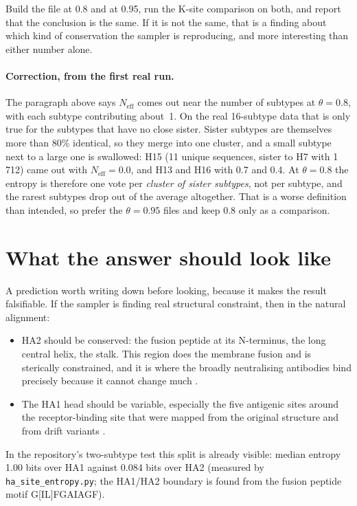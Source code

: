 \documentclass[11pt,a4paper]{article}
\newcommand{\file}[1]{\texttt{#1}}
\newcommand{\Neff}{N_{\mathrm{eff}}}
\begin{document}
\noindent
Build the file at 0.8 and at 0.95, run the K-site comparison on both, and report
that the conclusion is the same. If it is not the same, that is a finding about
which kind of conservation the sampler is reproducing, and more interesting than
either number alone.

\paragraph{Correction, from the first real run.}
The paragraph above says $\Neff$ comes out near the number of subtypes at
$\theta = 0.8$, with each subtype contributing about~1. On the real 16-subtype
data that is only true for the subtypes that have no close sister. Sister
subtypes are themselves more than 80\% identical, so they merge into one
cluster, and a small subtype next to a large one is swallowed: H15 (11 unique
sequences, sister to H7 with 1\,712) came out with $\Neff = 0.0$, and H13 and
H16 with 0.7 and 0.4. At $\theta = 0.8$ the entropy is therefore one vote per
\emph{cluster of sister subtypes}, not per subtype, and the rarest subtypes drop
out of the average altogether. That is a worse definition than intended, so
prefer the $\theta = 0.95$ files and keep 0.8 only as a comparison.

\section{What the answer should look like}

A prediction worth writing down before looking, because it makes the result
falsifiable. If the sampler is finding real structural constraint, then in the
natural alignment:

\begin{itemize}
  \item HA2 should be conserved: the fusion peptide at its N-terminus, the long
    central helix, the stalk. This region does the membrane fusion and is
    sterically constrained, and it is where the broadly neutralising antibodies
    bind precisely because it cannot change much
    \cite{skehel2000,ekiert2009,ekiert2011}.
  \item The HA1 head should be variable, especially the five antigenic sites
    around the receptor-binding site that were mapped from the original
    structure and from drift variants \cite{wiley1981,wilson1981}.
\end{itemize}

\noindent
In the repository's two-subtype test this split is already visible: median
entropy 1.00 bits over HA1 against 0.084 bits over HA2 (measured by
\file{ha\_site\_entropy.py}; the HA1/HA2 boundary is found from the fusion
peptide motif G[IL]FGAIAGF).
\end{document}
